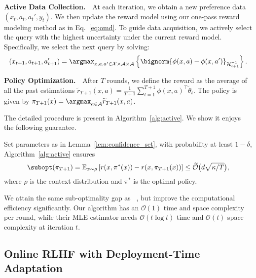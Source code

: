 \textbf{Active Data Collection.}~~At each iteration, we obtain a new preference data $(x_t, a_t, a_t', y_t)$. We then update the reward model using our one-pass reward modeling method as in Eq.~\eqref{eq:omd}. To guide data acquisition, we actively select the query with the highest uncertainty under the current reward model. Specifically, we select the next query by solving:
\begin{align}
  \label{eq:active-query}
  (x_{t+1}, a_{t+1}, a_{t+1}') = \argmax_{x, a, a^{\prime} \in \mathcal{X} \times \mathcal{A} \times \mathcal{A}} \left\{\bignorm{\phi(x, a) - \phi(x, a')}_{\mathcal{H}_{t+1}^{-1}}\right\}.
\end{align}

\textbf{Policy Optimization.}~~After $T$ rounds, we define the reward as the average of all the past estimations $\widetilde{r}_{T+1}(x, a) = \frac{1}{T+1} \sum_{t=1}^{T+1} \phi(x, a)^\top \widetilde{\theta}_t$. The policy is given by $\pi_{T+1}(x) = \argmax_{a \in \mathcal{A}} \widetilde{r}_{T+1}(x, a)$.

The detailed procedure is present in Algorithm~\ref{alg:active}. We show it enjoys the following guarantee.

\begin{myThm}
  \label{thm:active}
  Set parameters as in Lemma~\ref{lem:confidence_set}, with probability at least $1-\delta$, Algorithm~\ref{alg:active} ensures
  \begin{align*}
    \subopt(\pi_{T+1}) = \mathbb{E}_{x \sim \rho} \left[r(x, \pi^*(x)) - r(x, \pi_{T+1}(x))\right] \leq \widetilde{\mathcal{O}} \big(d \sqrt{{\kappa}/{T}}\big),
  \end{align*}
  where $\rho$ is the context distribution and $\pi^*$ is the optimal policy.
\end{myThm}

\begin{myRemark}
  We attain the same sub-optimality gap as ~\citet{arXiv'24:Das-RLHF-active}, but improve the computational efficiency significantly. Our algorithm has an $\mathcal{O}(1)$ time and space complexity per round, while their MLE estimator needs $\mathcal{O}(t \log t)$ time and $\mathcal{O}(t)$ space complexity at iteration $t$.
\end{myRemark}

\subsection{Online RLHF with Deployment-Time Adaptation}

